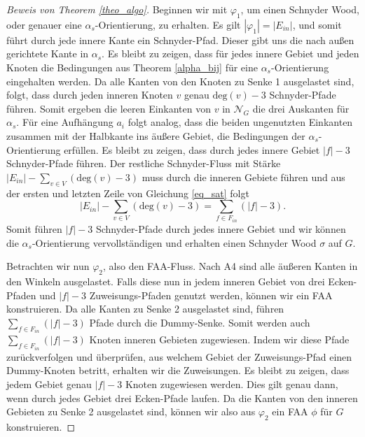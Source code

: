 \begin{proof}[Beweis von Theorem \ref{theo_algo}]
Beginnen wir mit $\varphi_1$, um einen Schnyder Wood, oder genauer eine $\alpha_s$-Orientierung, zu erhalten. Es gilt $|\varphi_1| = |E_{in}|$, und somit führt durch jede innere Kante ein Schnyder-Pfad. Dieser gibt uns die nach außen gerichtete Kante in $\alpha_s$. Es bleibt zu zeigen, dass für jedes innere Gebiet und jeden Knoten die Bedingungen aus Theorem \ref{alpha_bij} für eine $\alpha_s$-Orientierung eingehalten werden. Da alle Kanten von den Knoten zu Senke 1 ausgelastet sind, folgt, dass durch jeden inneren Knoten $v$ genau $\text{deg}(v)-3$ Schnyder-Pfade führen. Somit ergeben die leeren Einkanten von $v$ in $\mathcal{N}_G$ die drei Auskanten für $\alpha_s$. Für eine Aufhängung $a_i$ folgt analog, dass die beiden ungenutzten Einkanten zusammen mit der Halbkante ins äußere Gebiet, die Bedingungen der $\alpha_s$-Orientierung erfüllen. Es bleibt zu zeigen, dass durch jedes innere Gebiet $|f|-3$ Schnyder-Pfade führen. Der restliche Schnyder-Fluss mit Stärke $|E_{in}| - \sum_{v \in V} (\text{deg}(v)-3)$ muss durch die inneren Gebiete führen und aus der ersten und letzten Zeile von Gleichung \ref{eq_sat} folgt $$|E_{in}| - \sum_{v \in V} (\text{deg}(v)-3) = \sum_{f \in F_{in}} (|f|-3).$$
Somit führen $|f|-3$ Schnyder-Pfade durch jedes innere Gebiet und wir können die $\alpha_s$-Orientierung vervollständigen und erhalten einen Schnyder Wood $\sigma$ auf $G$.

Betrachten wir nun $\varphi_2$, also den FAA-Fluss. Nach A4 sind alle äußeren Kanten in den Winkeln ausgelastet. Falls diese nun in jedem inneren Gebiet von drei Ecken-Pfaden und $|f|-3$ Zuweisungs-Pfaden genutzt werden, können wir ein FAA konstruieren. Da alle Kanten zu Senke 2 ausgelastet sind, führen $\sum_{f \in F_{in}} (|f|-3)$ Pfade durch die Dummy-Senke. Somit werden auch $\sum_{f \in F_{in}} (|f|-3)$ Knoten inneren Gebieten zugewiesen. Indem wir diese Pfade zurückverfolgen und überprüfen, aus welchem Gebiet der Zuweisungs-Pfad einen Dummy-Knoten betritt, erhalten wir die Zuweisungen. Es bleibt zu zeigen, dass jedem Gebiet genau $|f|-3$ Knoten zugewiesen werden. Dies gilt genau dann, wenn durch jedes Gebiet drei Ecken-Pfade laufen. Da die Kanten von den inneren Gebieten zu Senke 2 ausgelastet sind, können wir also aus $\varphi_2$ ein FAA $\phi$ für $G$ konstruieren.


\end{proof}
